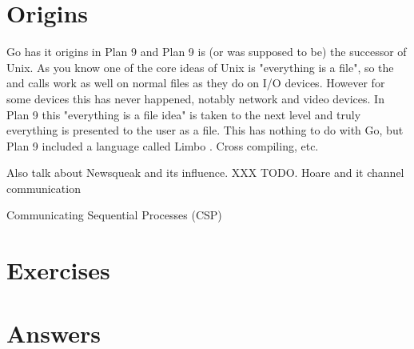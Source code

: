 \section{Origins}
Go has it origins in Plan 9 \cite{plan9} and Plan 9 is (or was 
supposed to be) the successor of Unix. As you know one of the
core ideas of Unix is "everything is a file", so the  and
 calls work as well on normal files as they do on I/O
devices. However for some devices this has never happened, notably
network and video devices. In Plan 9 this "everything is a file idea"
is taken to the next level and truly everything is presented to the 
user as a file. This has nothing to do with Go, but Plan 9 included
a language called Limbo \cite{limbo}. Cross compiling, etc.

Also talk about Newsqueak \cite{newsqueak} and its influence. XXX TODO.
Hoare \cite{hoare} and it channel communication

 Communicating Sequential Processes (CSP)

\section{Exercises}


\cleardoublepage
\section{Answers}
\shipoutAnswer
